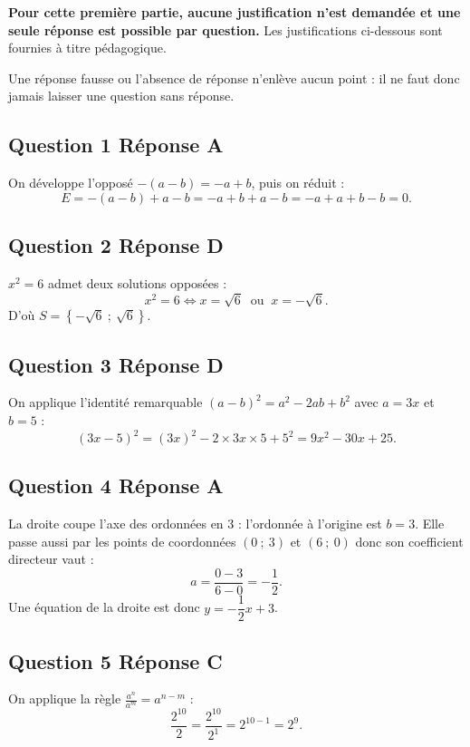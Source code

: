 \textbf{Pour cette première partie, aucune justification n'est demandée et une seule réponse est possible par question.} Les justifications ci-dessous sont fournies à titre pédagogique.

Une réponse fausse ou l'absence de réponse n'enlève aucun point : il ne faut donc jamais laisser une question sans réponse.

\subsection*{Question 1 \quad Réponse A}

On développe l'opposé $-(a-b) = -a + b$, puis on réduit :
\[E = -(a-b) + a - b = -a + b + a - b = -a+a + b-b = 0.\]

\subsection*{Question 2 \quad Réponse D}

$x^2 = 6$ admet deux solutions opposées :
\[x^2 = 6 \iff x = \sqrt{6} \ \text{ ou } \ x = -\sqrt{6}.\]
D'où $S = \left\{-\sqrt{6}~;~\sqrt{6}\right\}$.

\subsection*{Question 3 \quad Réponse D}

On applique l'identité remarquable $(a-b)^2 = a^2 - 2ab + b^2$ avec $a = 3x$ et $b = 5$ :
\[(3x-5)^2 = (3x)^2 - 2\times 3x \times 5 + 5^2 = 9x^2 - 30x + 25.\]

\subsection*{Question 4 \quad Réponse A}

La droite coupe l'axe des ordonnées en 3 : l'ordonnée à l'origine est $b = 3$. Elle passe
aussi par les points de coordonnées $(0~;~3)$ et $(6~;~0)$ donc son coefficient directeur vaut :
\[a = \dfrac{0 - 3}{6 - 0} = -\dfrac{1}{2}.\]
Une équation de la droite est donc $y = -\dfrac{1}{2}x + 3$.

\subsection*{Question 5 \quad Réponse C}

On applique la règle $\frac{a^n}{a^m}=a^{n-m}$ :
\[\dfrac{2^{10}}{2} = \dfrac{2^{10}}{2^1} = 2^{10-1} = 2^9.\]

